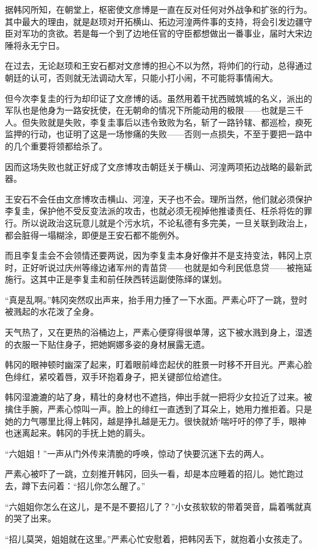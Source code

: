 据韩冈所知，在朝堂上，枢密使文彦博是一直在反对任何对外战争和扩张的行为。其中最大的理由，就是赵顼对开拓横山、拓边河湟两件事的支持，将会引发边疆守臣对军功的贪欲。若是每一个到了边地任官的守臣都想做出一番事业，届时大宋边陲将永无宁日。

在过去，无论赵顼和王安石都对文彦博的担心不以为然，将帅们的行动，总得通过朝廷的认可，否则就无法调动大军，只能小打小闹，不可能将事情闹大。

但今次李复圭的行为却印证了文彦博的话。虽然用着干扰西贼筑城的名义，派出的军队也是他身为一路安抚使，在无朝命的情况下所能动用的极限——也就是三千人。但失败就是失败，李复圭事后以违令致败为名，斩了一路钤辖、都巡检，瘐死监押的行动，也证明了这是一场惨痛的失败——否则一点损失，不至于要把一路中的几个重要将领都给杀了。

因而这场失败也就正好成了文彦博攻击朝廷关于横山、河湟两项拓边战略的最新武器。

王安石不会任由文彦博攻击横山、河湟，天子也不会。理所当然，他们就必须保护李复圭，保护他不受反变法派的攻击，也就必须无视掉他推诿责任、枉杀将佐的罪行。所以说政治这玩意儿就是个污水坑，不论私德有多完美，一旦关联到政治上，都会脏得一塌糊涂，即便是王安石都不能例外。

而且李复圭会不会领情还要两说，因为李复圭本身好像并不是支持变法，韩冈上京时，正好听说过庆州等缘边诸军州的青苗贷——也就是如今利民低息贷——被拖延施行。这其中正是李复圭和前任陕西转运副使陈绎的谋划。

“真是乱啊。”韩冈突然叹出声来，抬手用力捶了一下水面。严素心吓了一跳，登时被溅起的水花泼了全身。

天气热了，又在更热的浴桶边上，严素心便穿得很单薄，这下被水溅到身上，湿透的衣服一下贴住身子，把她婀娜多姿的身材展露无遗。

韩冈的眼神顿时幽深了起来，盯着眼前峰峦起伏的胜景一时移不开目光。严素心脸色绯红，紧咬着唇，双手环抱着身子，把关键部位给遮住。

韩冈湿漉漉的站了身，精壮的身材也不遮挡，伸出手就一把将少女拉近了过来。被擒住手腕，严素心惊叫一声。脸上的绯红一直透到了耳朵上，她用力推拒着。只是她的力气哪里比得上韩冈，越是挣扎越是无力。很快就娇`喘吁吁的停了手，眼神也迷离起来。韩冈的手抚上她的肩头。

“六姐姐！”一声从门外传来清脆的呼唤，惊动了快要沉迷下去的两人。

严素心被吓了一跳，立刻推开韩冈，回头一看，却是本应睡着的招儿。她忙跑过去，蹲下去问着：“招儿你怎么醒了。”

“六姐姐你怎么在这儿，是不是不要招儿了？”小女孩软软的带着哭音，扁着嘴就真的哭了出来。

“招儿莫哭，姐姐就在这里。”严素心忙安慰着，把韩冈丢下，就抱着小女孩走了。

